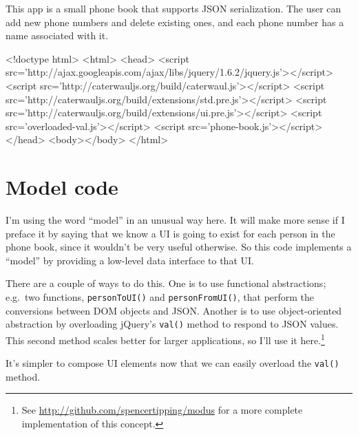 \documentclass{report}
\begin{document}
  This app is a small phone book that supports JSON serialization. The user can add new phone numbers and delete existing ones, and each phone number has a name associated with it.

\begin{resourcecode}
<!doctype html>
<html>
  <head>
  <script src='http://ajax.googleapis.com/ajax/libs/jquery/1.6.2/jquery.js'></script>
  <script src='http://caterwauljs.org/build/caterwaul.js'></script>
  <script src='http://caterwauljs.org/build/extensions/std.pre.js'></script>
  <script src='http://caterwauljs.org/build/extensions/ui.pre.js'></script>
  <script src='overloaded-val.js'></script>
  <script src='phone-book.js'></script>
  </head>
  <body></body>
</html> \end{resourcecode}

\section{Model code}
    I'm using the word ``model'' in an unusual way here. It will make more sense if I preface it by saying that we know a UI is going to exist for each person in the phone book, since it
    wouldn't be very useful otherwise. So this code implements a ``model'' by providing a low-level data interface to that UI.

    There are a couple of ways to do this. One is to use functional abstractions; e.g.~two functions, {\tt personToUI()} and {\tt personFromUI()}, that perform the conversions between DOM
    objects and JSON. Another is to use object-oriented abstraction by overloading jQuery's {\tt val()} method to respond to JSON values. This second method scales better for larger
    applications, so I'll use it here.\footnote{See \url{http://github.com/spencertipping/modus} for a more complete implementation of this concept.}


    It's simpler to compose UI elements now that we can easily overload the {\tt val()} method.
\end{document}
